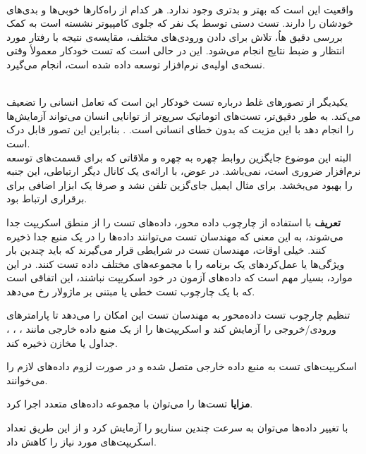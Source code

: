  
\\
واقعیت این است که بهتر و بدتری وجود ندارد. هر کدام از راه‌کارها خوبی‌ها و بدی‌های خودشان را دارند. تست دستی توسط یک نفر که جلوی کامپیوتر نشسته است به کمک بررسی دقیق هاُ، تلاش برای دادن ورودی‌های مختلف، مقایسه‌ی نتیجه با رفتار مورد انتظار و ضبط نتایج انجام می‌شود.  این در حالی است که تست خودکار معمولأ وقتی نسخه‌ی اولیه‌ی نرم‌افزار توسعه داده شده است، انجام می‌گیرد. 

  
\\
یکیدیگر از تصورهای غلط درباره تست خودکار این است که تعامل انسانی را تضعیف می‌کند. به طور دقیق‌تر، تست‌های اتوماتیک سریع‌تر از توانایی انسان می‌تواند آزمایش‌ها را انجام دهد با این مزیت که بدون خطای انسانی است.  . بنابراین این تصور قابل درک است. 
\\
البته این موضوع جایگزین روابط چهره به چهره و ملاقاتی که برای قسمت‌های توسعه نرم‌افزار ضروری است، نمی‌باشد. در عوض، با ارائه‌ی یک کانال دیگر ارتباطی، این جنبه را بهبود می‌بخشد. برای مثال ایمیل جای‌گزین تلفن نشد و صرفا یک ابزار اضافی برای برقراری ارتباط بود.




	 
	\textbf{تعریف} 
	با استفاده از چارچوب داده محور، داده‌های تست را از منطق اسکریپت جدا می‌شوند، به این معنی که مهندسان تست می‌توانند داده‌ها را در یک منبع جدا ذخیره کنند. خیلی اوقات، مهندسان تست در شرایطی قرار می‌گیرند که باید چندین بار ویژگی‌ها یا عمل‌کردهای یک برنامه را با مجموعه‌های مختلف داده تست کنند. در این موارد، بسیار مهم است که داده‌های آزمون در خود اسکریپت  نباشند، این اتفاقی است که با یک چارچوب تست خطی یا مبتنی بر ماژولار رخ می‌دهد.
	
	تنظیم چارچوب تست داده‌محور به مهندسان تست این امکان را می‌دهد تا پارامترهای ورودی/خروجی را آزمایش کند و اسکریپت‌ها را از یک منبع داده خارجی مانند ، ، ، جداول   یا مخازن  ذخیره کند.
	
	اسکریپت‌های تست به منبع داده خارجی متصل شده و در صورت لزوم داده‌های لازم را می‌خوانند.
	
	
	\textbf{مزایا} 
	تست‌ها را می‌توان با مجموعه داده‌های متعدد اجرا کرد.
	
	با تغییر داده‌ها می‌توان به سرعت چندین سناریو را آزمایش کرد و از این طریق تعداد اسکریپت‌های مورد نیاز را کاهش داد.
	
